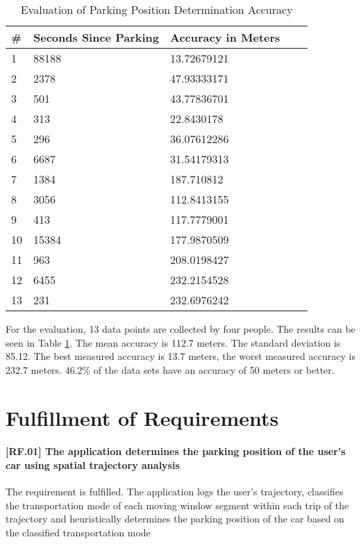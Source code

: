 \begin{table}[h!]
    \centering
    \begin{tabular}{|l|l|l|l|l|} \toprule
        \# & Seconds Since Parking & Accuracy in Meters \\ \midrule
        1 & 88188 & 13.72679121 \\ 
        2 & 2378 & 47.93333171 \\ 
        3 & 501 & 43.77836701 \\ 
        4 & 313 & 22.8430178 \\ 
        5 & 296 & 36.07612286 \\ 
        6 & 6687 & 31.54179313 \\ 
        7 & 1384 & 187.710812 \\ 
        8 & 3056 & 112.8413155 \\ 
        9 & 413 & 117.7779001 \\ 
        10 & 15384 & 177.9870509 \\ 
        11 & 963 & 208.0198427 \\ 
        12 & 6455 & 232.2154528 \\ 
        13 & 231 & 232.6976242 \\ \bottomrule 
    \end{tabular}
    \caption{Evaluation of Parking Position Determination Accuracy}
    \label{table:acc_eval}
\end{table}{}



For the evaluation, 13 data points are collected by four people. The results can be seen in Table \ref{table:acc_eval}. The mean accuracy is 112.7 meters. The standard deviation is 85.12. The best measured accuracy is 13.7 meters, the worst measured accuracy is 232.7 meters. 46.2\% of the data sets have an accuracy of 50 meters or better.

\section{Fulfillment of Requirements}

\paragraph{[RF.01] The application determines the parking position of the user's car using spatial trajectory analysis}
The requirement is fulfilled. The application logs the user's trajectory, classifies the transportation mode of each moving window segment within each trip of the trajectory and heuristically determines the parking position of the car based on the classified transportation mode

